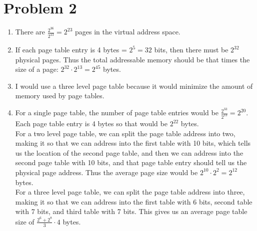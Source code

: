 \documentclass{article}
\begin{document}
\section*{Problem 2}
\begin{enumerate}[label=\alph*)]
\item There are $\frac{2^{36}}{2^{13}} = 2^{23}$ pages in the virtual address space. \\
\item If each page table entry is 4 bytes = $2^5 = 32$ bits, then there must be $2^32$ physical pages. Thus the total addressable memory should be that times the size of a page: $2^32 \cdot 2^{13} = 2^{45}$ bytes. \\
\item I would use a three level page table because it would minimize the amount of memory used by page tables. \\
\item For a single page table, the number of page table entries would be $\frac{2^33}{2^13} = 2^{20}$. Each page table entry is 4 bytes so that would be $2^{22}$ bytes.\\
For a two level page table, we can split the page table address into two, making it so that we can address into the first table with 10 bits, which tells us the location of the second page table, and then we can address into the second page table with 10 bits, and that page table entry should tell us the physical page address. Thus the average page size would be $2^10 \cdot 2^2 = 2^{12}$ bytes. \\
For a three level page table, we can split the page table address into three, making it so that we can address into the first table with 6 bits, second table with 7 bits, and third table with 7 bits. This gives us an average page table size of $\frac{2^6 + 2^8}{3} \cdot 4$ bytes. 
\end{enumerate}
\end{document}
